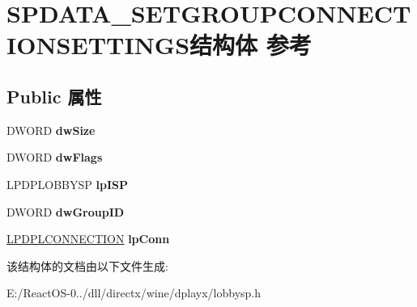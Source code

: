 \hypertarget{struct_s_p_d_a_t_a___s_e_t_g_r_o_u_p_c_o_n_n_e_c_t_i_o_n_s_e_t_t_i_n_g_s}{}\section{S\+P\+D\+A\+T\+A\+\_\+\+S\+E\+T\+G\+R\+O\+U\+P\+C\+O\+N\+N\+E\+C\+T\+I\+O\+N\+S\+E\+T\+T\+I\+N\+G\+S结构体 参考}
\label{struct_s_p_d_a_t_a___s_e_t_g_r_o_u_p_c_o_n_n_e_c_t_i_o_n_s_e_t_t_i_n_g_s}
\subsection*{Public 属性}
\begin{DoxyCompactItemize}
\item 
\mbox{\label{struct_s_p_d_a_t_a___s_e_t_g_r_o_u_p_c_o_n_n_e_c_t_i_o_n_s_e_t_t_i_n_g_s_aea1efb2183493ac435bb496b56b00b7a}} 
D\+W\+O\+RD {\bfseries dw\+Size}
\item 
\mbox{\label{struct_s_p_d_a_t_a___s_e_t_g_r_o_u_p_c_o_n_n_e_c_t_i_o_n_s_e_t_t_i_n_g_s_a6fc7dd13b5088bbcc08d89f9ada2eba0}} 
D\+W\+O\+RD {\bfseries dw\+Flags}
\item 
\mbox{\label{struct_s_p_d_a_t_a___s_e_t_g_r_o_u_p_c_o_n_n_e_c_t_i_o_n_s_e_t_t_i_n_g_s_a3647284d1fc607b8cb380495d049ca94}} 
L\+P\+D\+P\+L\+O\+B\+B\+Y\+SP {\bfseries lp\+I\+SP}
\item 
\mbox{\label{struct_s_p_d_a_t_a___s_e_t_g_r_o_u_p_c_o_n_n_e_c_t_i_o_n_s_e_t_t_i_n_g_s_a12bc6d3ae1e1f3b04a1dbca7e95d955b}} 
D\+W\+O\+RD {\bfseries dw\+Group\+ID}
\item 
\mbox{\label{struct_s_p_d_a_t_a___s_e_t_g_r_o_u_p_c_o_n_n_e_c_t_i_o_n_s_e_t_t_i_n_g_s_a0ad52f7c918ab871ad56afbb46383720}} 
\hyperlink{structtag_d_p_l_c_o_n_n_e_c_t_i_o_n}{L\+P\+D\+P\+L\+C\+O\+N\+N\+E\+C\+T\+I\+ON} {\bfseries lp\+Conn}
\end{DoxyCompactItemize}


该结构体的文档由以下文件生成\+:\begin{DoxyCompactItemize}
\item 
E\+:/\+React\+O\+S-\/0../dll/directx/wine/dplayx/lobbysp.\+h\end{DoxyCompactItemize}
